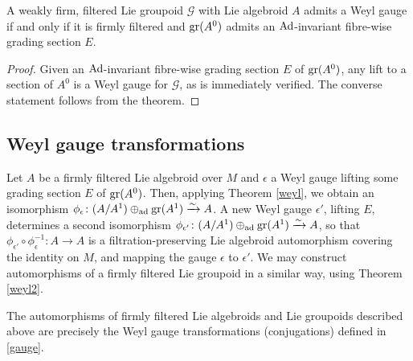 \documentclass[leqno,12pt]{amsart} %
\begin{document}
\begin{corollary}\label{ew2}
  A weakly firm, filtered Lie groupoid ${\mathcal G} $ with Lie algebroid $A$ admits a
  Weyl gauge if and only if it is firmly filtered and $\operatorname{\operatorname{gr}}(A^0)$ admits an
  $\operatorname{Ad}$-invariant fibre-wise grading section $E$.
\end{corollary}
\begin{proof}
  Given an $\operatorname{Ad}$-invariant fibre-wise grading section $E$ of $\operatorname{\operatorname{gr}}(A^0)$, any lift
  to a section of $A^0$ is a Weyl gauge for $\mathcal G$, as is immediately verified. The
  converse statement follows from the theorem.
\end{proof}

\subsection{Weyl gauge transformations}\label{gauge_transformations}
Let $A$ be a firmly filtered Lie algebroid over $M$ and $\epsilon$ a Weyl gauge
lifting some grading section $E$ of $\operatorname{\operatorname{gr}}(A^0)$. Then, applying Theorem \ref{weyl}, we
obtain an isomorphism
$\phi_\epsilon \colon (A/A^1)\oplus_{\operatorname{ad}}\operatorname{\operatorname{gr}}(A^1) \xrightarrow{\sim} A$. A new
Weyl gauge $\epsilon'$, lifting $E$, determines a second isomorphism
$\phi_{\epsilon'} \colon (A/A^1)\oplus_{\operatorname{ad}}\operatorname{\operatorname{gr}}(A^1) \xrightarrow{\sim} A$, so
that $\phi_{\epsilon'}\circ \phi_\epsilon^{-1} \colon A \rightarrow A$ is a
filtration-preserving Lie algebroid automorphism covering the identity on $M$, and mapping
the gauge $\epsilon$ to $\epsilon'$. We may construct automorphisms of a firmly filtered
Lie groupoid in a similar way, using Theorem \ref{weyl2}.

\begin{theorem}
  The automorphisms of firmly filtered Lie algebroids and Lie groupoids described above
  are precisely the Weyl gauge transformations (conjugations) defined in \ref{gauge}.
\end{theorem}
\end{document}
